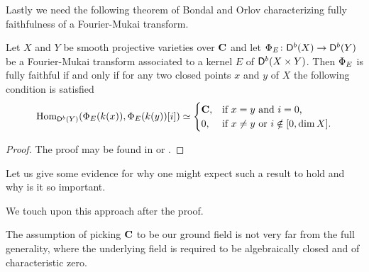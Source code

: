 

Lastly we need the following theorem of Bondal and Orlov characterizing fully faithfulness of a Fourier-Mukai transform.

\begin{theorem}
    Let $X$ and $Y$ be smooth projective varieties over $\mathbf C$ and let $\Phi_{E} \colon \mathsf{D}^b(X) \to \mathsf{D}^b(Y)$ be a Fourier-Mukai transform associated to a kernel $E$ of $\mathsf{D}^b(X \times Y)$. Then $\Phi_{E}$ is fully faithful if and only if for any two closed points $x$ and $y$ of $X$ the following condition is satisfied
    \begin{equation}
            \operatorname{Hom}_{\mathsf{D}^b(Y)}(\Phi_{E}(k(x)), \Phi_{E}(k(y))[i]) \simeq \begin{cases}
                \mathbf C, &\text{if $x = y$ and $i = 0$,} \\
                0, &\text{if $x \neq y$ or $i \notin [0, \dim X]$.}
            \end{cases}
    \end{equation}
\end{theorem}

\begin{proof}
    The proof may be found in \cite[\S 7, Proposition 7.1]{huybrechts2006fouriermukai} or \cite[Theorem 5.1]{bridgeland2019equivalencestriangulatedcategoriesfouriermukai}.
\end{proof}

\begin{remark}
    Let us give some evidence for why one might expect such a result to hold and why is it so important.

    We touch upon this approach after the proof. 
\end{remark}

\begin{remark}        
    The assumption of picking $\mathbf C$ to be our ground field is not very far from the full generality, where the underlying field is required to be algebraically closed and of characteristic zero.
\end{remark}

